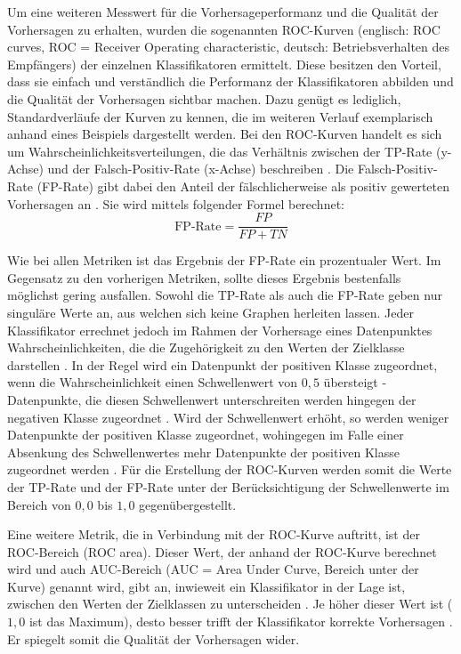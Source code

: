 \label{roc-def}
Um eine weiteren Messwert für die Vorhersageperformanz und die Qualität der Vorhersagen zu erhalten, wurden die sogenannten ROC-Kurven (englisch: ROC curves, ROC = Receiver Operating characteristic, deutsch: Betriebsverhalten des Empfängers) der einzelnen Klassifikatoren ermittelt. Diese besitzen den Vorteil, dass sie einfach und verständlich die Performanz der Klassifikatoren abbilden und die Qualität der Vorhersagen \glqq sichtbar\grqq{} machen. Dazu genügt es lediglich, Standardverläufe der Kurven zu kennen, die im weiteren Verlauf exemplarisch anhand eines Beispiels dargestellt werden.
Bei den ROC-Kurven handelt es sich um Wahrscheinlichkeitsverteilungen, die das Verhältnis zwischen der TP-Rate (y-Achse) und der Falsch-Positiv-Rate (x-Achse) beschreiben \cite{Sammut2017,Narkhede2018}. Die Falsch-Positiv-Rate (FP-Rate) gibt dabei den Anteil der fälschlicherweise als positiv gewerteten Vorhersagen an \cite{Alpaydin2010}. Sie wird mittels folgender Formel berechnet:
\\\[\text{FP-Rate} = \frac{FP}{FP+TN}\]

Wie bei allen Metriken ist das Ergebnis der FP-Rate ein prozentualer Wert. Im Gegensatz zu den vorherigen Metriken, sollte dieses Ergebnis bestenfalls möglichst gering ausfallen. Sowohl die TP-Rate als auch die FP-Rate geben nur singuläre Werte an, aus welchen sich keine Graphen herleiten lassen. Jeder Klassifikator errechnet jedoch im Rahmen der Vorhersage eines Datenpunktes Wahrscheinlichkeiten, die die Zugehörigkeit zu den Werten der Zielklasse darstellen \cite{KNIMETV2019}. In der Regel wird ein Datenpunkt der positiven Klasse zugeordnet, wenn die Wahrscheinlichkeit einen Schwellenwert von $0,5$ übersteigt - Datenpunkte, die diesen Schwellenwert unterschreiten werden hingegen der negativen Klasse zugeordnet \cite{KNIMETV2019}. Wird der Schwellenwert erhöht, so werden weniger Datenpunkte der positiven Klasse zugeordnet, wohingegen im Falle einer Absenkung des Schwellenwertes mehr Datenpunkte der positiven Klasse zugeordnet werden \cite{KNIMETV2019}. Für die Erstellung der ROC-Kurven werden somit die Werte der TP-Rate und der FP-Rate unter der Berücksichtigung der Schwellenwerte im Bereich von $0,0$ bis $1,0$ gegenübergestellt.

Eine weitere Metrik, die in Verbindung mit der ROC-Kurve auftritt, ist der ROC-Bereich (ROC area). Dieser Wert, der anhand der ROC-Kurve berechnet wird und auch AUC-Bereich (AUC = Area Under Curve, Bereich unter der Kurve) genannt wird, gibt an, inwieweit ein Klassifikator in der Lage ist, zwischen den Werten der Zielklassen zu unterscheiden \cite{Narkhede2018}. Je höher dieser Wert ist ($1,0$ ist das Maximum), desto besser trifft der Klassifikator korrekte Vorhersagen \cite{Narkhede2018}. Er spiegelt somit die Qualität der Vorhersagen wider.

